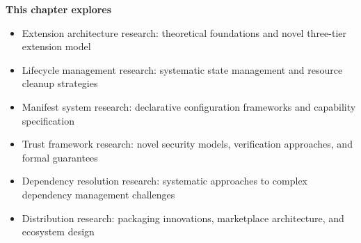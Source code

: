 
\begin{tcolorbox}[
    enhanced,
    colback=white,
    colframe=brandPrimary!40,
    boxrule=1.5pt,
    arc=15pt,
    drop shadow={brandPrimary!25},
    left=1.5cm,
    right=1.5cm,
    top=1.2cm,
    bottom=1.2cm
]
\begin{center}
{\Large\textbf{\textcolor{brandPrimary}{This chapter explores}}}
\end{center}

\vspace{0.8cm}

\begin{itemize}[leftmargin=1.2cm, itemsep=0.4cm, label={\textcolor{brandAccent}{$\blacktriangleright$}}]
    \item {\large Extension architecture research: theoretical foundations and novel three-tier extension model}
    \item {\large Lifecycle management research: systematic state management and resource cleanup strategies}
    \item {\large Manifest system research: declarative configuration frameworks and capability specification}
    \item {\large Trust framework research: novel security models, verification approaches, and formal guarantees}
    \item {\large Dependency resolution research: systematic approaches to complex dependency management challenges}
    \item {\large Distribution research: packaging innovations, marketplace architecture, and ecosystem design}
\end{itemize}
\end{tcolorbox}

\clearpage
